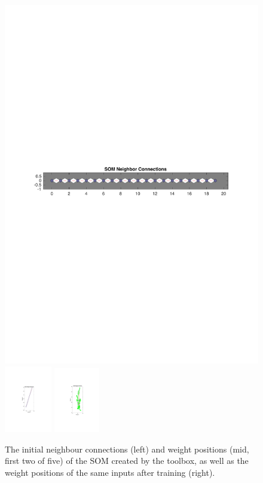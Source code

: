 \documentclass[10pt, oneside]{article}
\begin{document}
\begin{figure}[h]
\begin{center}
\includegraphics[width=12.5cm]{somnc.pdf} \includegraphics[width=2.07cm]{sompos.pdf} \includegraphics[width=2cm]{sompos-aftertraining.pdf}
\end{center}
\caption{\label{fig:som-init} The initial neighbour connections (left) and weight positions (mid, first two of five) of the SOM created by the toolbox, as well as the weight positions of the same inputs after training (right).}
\end{figure}
\end{document}
